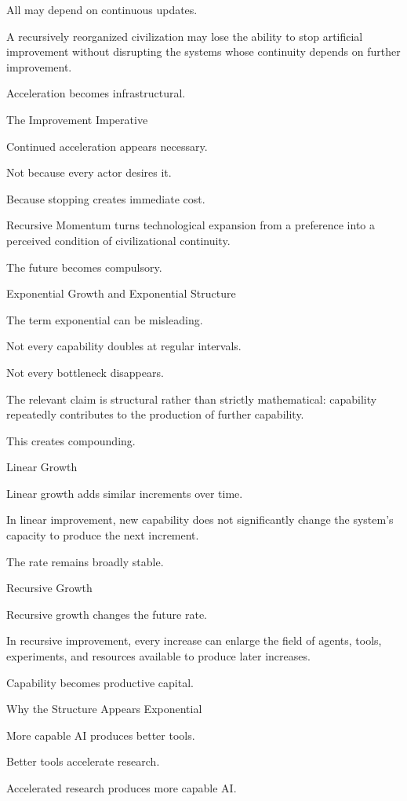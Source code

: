 All may depend on continuous updates.

A recursively reorganized civilization may lose the ability to stop artificial improvement without disrupting the systems whose continuity depends on further improvement.

Acceleration becomes infrastructural.

The Improvement Imperative

Continued acceleration appears necessary.

Not because every actor desires it.

Because stopping creates immediate cost.

Recursive Momentum turns technological expansion from a preference into a perceived condition of civilizational continuity.

The future becomes compulsory.

Exponential Growth and Exponential Structure

The term exponential can be misleading.

Not every capability doubles at regular intervals.

Not every bottleneck disappears.

The relevant claim is structural rather than strictly mathematical: capability repeatedly contributes to the production of further capability.

This creates compounding.

Linear Growth

Linear growth adds similar increments over time.

In linear improvement, new capability does not significantly change the system’s capacity to produce the next increment.

The rate remains broadly stable.

Recursive Growth

Recursive growth changes the future rate.

In recursive improvement, every increase can enlarge the field of agents, tools, experiments, and resources available to produce later increases.

Capability becomes productive capital.

Why the Structure Appears Exponential

More capable AI produces better tools.

Better tools accelerate research.

Accelerated research produces more capable AI.

